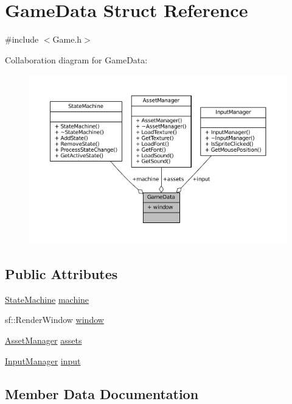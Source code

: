\hypertarget{structGameData}{}\section{Game\+Data Struct Reference}
\label{structGameData}


{\ttfamily \#include $<$Game.\+h$>$}



Collaboration diagram for Game\+Data\+:
\nopagebreak
\begin{figure}[H]
\begin{center}
\leavevmode
\includegraphics[width=350pt]{structGameData__coll__graph}
\end{center}
\end{figure}
\subsection*{Public Attributes}
\begin{DoxyCompactItemize}
\item 
\mbox{\hyperlink{classStateMachine}{State\+Machine}} \mbox{\hyperlink{structGameData_a8dfa448b18baef58877cd0365f4c1978}{machine}}
\item 
sf\+::\+Render\+Window \mbox{\hyperlink{structGameData_ad3ebf49a95d78b14047b92b20d39b810}{window}}
\item 
\mbox{\hyperlink{classAssetManager}{Asset\+Manager}} \mbox{\hyperlink{structGameData_ad19b66c159b0f14aecb7b2fd92d1b7bb}{assets}}
\item 
\mbox{\hyperlink{classInputManager}{Input\+Manager}} \mbox{\hyperlink{structGameData_abdfb34b80f7627eebbe484144dd9b589}{input}}
\end{DoxyCompactItemize}


\subsection{Member Data Documentation}
\mbox{\label{structGameData_ad19b66c159b0f14aecb7b2fd92d1b7bb}} 
